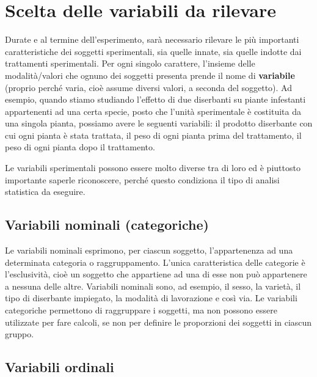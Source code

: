 \documentclass[a4paper,12pt,oneside]{book}
\begin{document}
\hypertarget{scelta-delle-variabili-da-rilevare}{%
\section{Scelta delle variabili da rilevare}\label{scelta-delle-variabili-da-rilevare}}

Durate e al termine dell'esperimento, sarà necessario rilevare le più importanti caratteristiche dei soggetti sperimentali, sia quelle innate, sia quelle indotte dai trattamenti sperimentali. Per ogni singolo carattere, l'insieme delle modalità/valori che ognuno dei soggetti presenta prende il nome di \textbf{variabile} (proprio perché varia, cioè assume diversi valori, a seconda del soggetto). Ad esempio, quando stiamo studiando l'effetto di due diserbanti su piante infestanti appartenenti ad una certa specie, posto che l'unità sperimentale è costituita da una singola pianta, possiamo avere le seguenti variabili: il prodotto diserbante con cui ogni pianta è stata trattata, il peso di ogni pianta prima del trattamento, il peso di ogni pianta dopo il trattamento.

Le variabili sperimentali possono essere molto diverse tra di loro ed è piuttosto importante saperle riconoscere, perché questo condiziona il tipo di analisi statistica da eseguire.

\hypertarget{variabili-nominali-categoriche}{%
\subsection{Variabili nominali (categoriche)}\label{variabili-nominali-categoriche}}

Le variabili nominali esprimono, per ciascun soggetto, l'appartenenza ad una determinata categoria o raggruppamento. L'unica caratteristica delle categorie è l'esclusività, cioè un soggetto che appartiene ad una di esse non può appartenere a nessuna delle altre. Variabili nominali sono, ad esempio, il sesso, la varietà, il tipo di diserbante impiegato, la modalità di lavorazione e così via. Le variabili categoriche permettono di raggruppare i soggetti, ma non possono essere utilizzate per fare calcoli, se non per definire le proporzioni dei soggetti in ciascun gruppo.

\hypertarget{variabili-ordinali}{%
\subsection{Variabili ordinali}\label{variabili-ordinali}}
\end{document}
